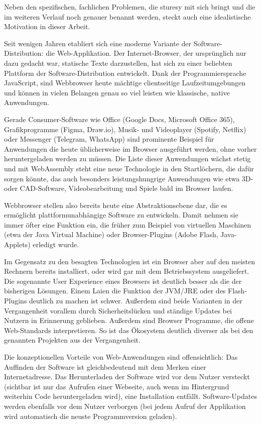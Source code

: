 Neben den spezifischen, fachlichen Problemen, die \ac{sturesy} mit sich bringt und die im weiteren Verlauf noch genauer benannt werden, steckt auch eine idealistische Motivation in dieser Arbeit.

Seit wenigen Jahren etabliert sich eine moderne Variante der Software-Distribution: die Web-Applikation. Der Internet-Browser, der ursprünglich nur dazu gedacht war, statische Texte darzustellen, hat sich zu einer beliebten Plattform der Software-Distribution entwickelt. Dank der Programmiersprache JavaScript, sind Webbrowser heute mächtige clientseitige Laufzeitumgebungen und können in vielen Belangen genau so viel leisten wie klassische, native Anwendungen.

Gerade Consumer-Software wie Office (Google Docs, Microsoft Office 365), Grafikprogramme (Figma, Draw.io), Musik- und Videoplayer (Spotify, Netflix) oder Messenger (Telegram, WhatsApp) sind prominente Beispiel für Anwendungen die heute üblicherweise im Browser ausgeführt werden, ohne vorher heruntergeladen werden zu müssen. Die Liste dieser Anwendungen wächst stetig und mit WebAssembly steht eine neue Technologie in den Startlöchern, die dafür sorgen könnte, das auch besonders leistungshungrige Anwendungen wie etwa 3D- oder CAD-Software, Videobearbeitung und Spiele bald im Browser laufen.

Webbrowser stellen also bereits heute eine Abstraktionsebene dar, die es ermöglicht plattformunabhängige Software zu entwickeln. Damit nehmen sie immer öfter eine Funktion ein, die früher zum Beispiel von virtuellen Maschinen (etwa der Java Virtual Machine) oder Browser-Plugins (Adobe Flash, Java-Applets) erledigt wurde.

Im Gegensatz zu den besagten Technologien ist ein Browser aber auf den meisten Rechnern bereits installiert, oder wird gar mit dem Betriebssystem ausgeliefert. Die sogenannte User Experience eines Browsers ist deutlich besser als die der bisherigen Lösungen. Einem Laien die Funktion der JVM/JRE oder des Flash-Plugins deutlich zu machen ist schwer. Außerdem sind beide Varianten in der Vergangenheit vorallem durch Sicherheitslücken und ständige Updates bei Nutzern in Erinnerung geblieben. Außerdem sind Browser Programme, die offene Web-Standards interpretieren. So ist das Ökosystem deutlich diverser als bei den genannten Projekten aus der Vergangenheit.

Die konzeptionellen Vorteile von Web-Anwendungen sind offensichtlich: Das Auffinden der Software ist gleichbedeutend mit dem Merken einer Internetadresse. Das Herunterladen der Software wird vor dem Nutzer versteckt (sichtbar ist nur das Aufrufen einer Webseite, auch wenn im Hintergrund weiterhin Code heruntergeladen wird), eine Installation entfällt. Software-Updates werden ebenfalls vor dem Nutzer verborgen (bei jedem Aufruf der Applikation wird automatisch die neuste Programmversion geladen).

